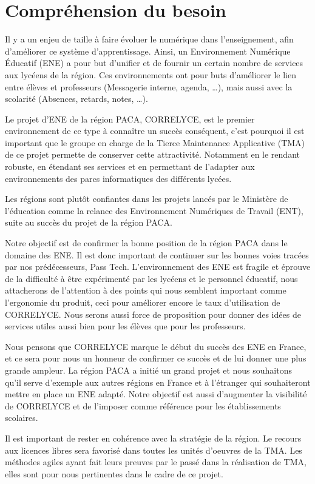 \section{Compréhension du besoin}
Il y a un enjeu de taille à faire évoluer le numérique dans l’enseignement, afin d’améliorer ce système d’apprentissage.  
Ainsi, un Environnement Numérique Éducatif (ENE) a pour but d’unifier et de fournir un certain nombre de services aux lycéens de la région. Ces environnements ont pour buts d’améliorer le lien entre élèves et professeurs (Messagerie interne, agenda, …), mais aussi avec la scolarité (Absences, retards, notes, …).

Le projet d’ENE de la région PACA, CORRELYCE, est le premier environnement de ce type à connaître un succès conséquent, c’est pourquoi il est important que le groupe en charge de la Tierce Maintenance Applicative (TMA) de ce projet permette de conserver cette attractivité. Notamment en le rendant robuste, en étendant ses services et en permettant de l’adapter aux environnements des parcs informatiques des différents lycées.

Les régions sont plutôt confiantes dans les projets lancés par le Ministère de l'éducation comme la relance des Environnement Numériques de Travail (ENT), suite au succès du projet de la région PACA. 

Notre objectif est de confirmer la bonne position de la région PACA dans le domaine des ENE. Il est donc important de continuer sur les bonnes voies tracées par nos prédécesseurs, Pass Tech. 
L’environnement des ENE est fragile et éprouve de la difficulté à être expérimenté par les lycéens et le personnel éducatif, nous attacherons de l’attention à des points qui nous semblent important comme l’ergonomie du produit, ceci pour améliorer encore le taux d’utilisation de CORRELYCE. Nous serons aussi force de proposition pour donner des idées de services utiles aussi bien pour les élèves que pour les professeurs.

 Nous pensons que CORRELYCE marque le début du succès des ENE en France, et ce sera pour nous un honneur de confirmer ce succès et de lui donner une plus grande ampleur. La région PACA a initié un grand projet et nous souhaitons qu’il serve d’exemple aux autres régions en France et à l’étranger qui souhaiteront mettre en place un ENE adapté. Notre objectif est aussi d’augmenter la visibilité de CORRELYCE et de l’imposer comme référence pour les établissements scolaires.

Il est important de rester en cohérence avec la stratégie de la région. Le recours aux licences libres sera favorisé dans toutes les unités d’oeuvres de la TMA. Les méthodes agiles ayant fait leurs preuves par le passé dans la réalisation de TMA, elles sont pour nous pertinentes dans le cadre de ce projet.